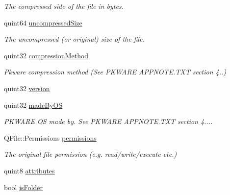 \begin{DoxyCompactItemize}
\begin{DoxyCompactList}\small\item\em The compressed side of the file in bytes. \end{DoxyCompactList}\item 
quint64 \hyperlink{class_zip_file_info_ade1c9213a715166ab723e738ad704289}{uncompressed\+Size}\hypertarget{class_zip_file_info_ade1c9213a715166ab723e738ad704289}{}\label{class_zip_file_info_ade1c9213a715166ab723e738ad704289}

\begin{DoxyCompactList}\small\item\em The uncompressed (or original) size of the file. \end{DoxyCompactList}\item 
quint32 \hyperlink{class_zip_file_info_a70b6f0f38965a8e768724b23ae07ccfc}{compression\+Method}\hypertarget{class_zip_file_info_a70b6f0f38965a8e768724b23ae07ccfc}{}\label{class_zip_file_info_a70b6f0f38965a8e768724b23ae07ccfc}

\begin{DoxyCompactList}\small\item\em Pkware compression method (See P\+K\+W\+A\+RE A\+P\+P\+N\+O\+T\+E.\+T\+XT section 4..) \end{DoxyCompactList}\item 
quint32 \hyperlink{class_zip_file_info_a3c716f122b4ef2855fda29c85134afc9}{version}
\item 
quint32 \hyperlink{class_zip_file_info_a5d76d9072b0814a107593ebde156b847}{made\+By\+OS}\hypertarget{class_zip_file_info_a5d76d9072b0814a107593ebde156b847}{}\label{class_zip_file_info_a5d76d9072b0814a107593ebde156b847}

\begin{DoxyCompactList}\small\item\em P\+K\+W\+A\+RE OS made by. See P\+K\+W\+A\+RE A\+P\+P\+N\+O\+T\+E.\+T\+XT section 4.... \end{DoxyCompactList}\item 
Q\+File\+::\+Permissions \hyperlink{class_zip_file_info_a88fd608b8464a8819e961dc8502f7358}{permissions}\hypertarget{class_zip_file_info_a88fd608b8464a8819e961dc8502f7358}{}\label{class_zip_file_info_a88fd608b8464a8819e961dc8502f7358}

\begin{DoxyCompactList}\small\item\em The original file permission (e.\+g. read/write/execute etc.) \end{DoxyCompactList}\item 
quint8 \hyperlink{class_zip_file_info_add65b96e7292b4b9cc64df88df825757}{attributes}
\item 
bool \hyperlink{class_zip_file_info_abf01ca906861f366d319c8225080986b}{is\+Folder}\hypertarget{class_zip_file_info_abf01ca906861f366d319c8225080986b}{}\label{class_zip_file_info_abf01ca906861f366d319c8225080986b}


\end{DoxyCompactItemize}
